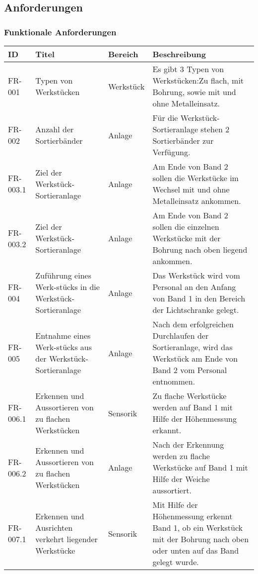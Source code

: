 \documentclass[oneside,a4paper,titlepage]{scrartcl} %
\begin{document}
\subsection{Anforderungen}

\subsubsection{Funktionale Anforderungen}
\begin{small}
 \begin{longtable}{|p{2cm}|p{4cm}|p{1.5cm}|p{5.5cm}|}
  \hline
  \textbf{ID} & \textbf{Titel} & \textbf{Bereich} & \textbf{Beschreibung}\\
  \toprule
  \endhead
  \hline
  FR-001 & Typen von Werkstücken & Werkstück & Es gibt 3 Typen von Werkstücken:Zu flach, mit Bohrung, sowie mit und ohne Metalleinsatz.\\
  \hline
  \rowcolor{gray} FR-002 & Anzahl der Sortierbänder & Anlage & Für die Werkstück-Sortieranlage stehen 2 Sortierbänder zur Verfügung.\\
  \hline
  FR-003.1 & Ziel der Werkstück-Sortieranlage & Anlage & Am Ende von Band 2 sollen die Werkstücke im Wechsel mit und ohne Metalleinsatz ankommen.\\
  \hline
  FR-003.2 & Ziel der Werkstück-Sortieranlage & Anlage & Am Ende von Band 2 sollen die einzelnen Werkstücke mit der Bohrung nach oben liegend ankommen.\\
  \hline
  \rowcolor{gray} FR-004 & Zuführung eines Werk-stücks in die Werkstück-Sortieranlage & Anlage & Das Werkstück wird vom Personal an den Anfang von Band 1 in den Bereich der Lichtschranke gelegt.\\
  \hline
  FR-005 & Entnahme eines Werk-stücks aus der Werkstück-Sortieranlage & Anlage & Nach dem erfolgreichen Durchlaufen der Sortieranlage, wird das Werkstück am Ende von Band 2 vom Personal entnommen.\\
  \hline
  \rowcolor{gray} FR-006.1 & Erkennen und Aussortieren von zu flachen Werkstücken & Sensorik & Zu flache Werkstücke werden auf Band 1 mit Hilfe der Höhenmessung erkannt.\\
  \hline
  \rowcolor{gray} FR-006.2 & Erkennen und Aussortieren von zu flachen Werkstücken & Anlage & Nach der Erkennung werden zu flache Werkstücke auf Band 1 mit Hilfe der Weiche aussortiert.\\
  \hline
  FR-007.1 & Erkennen und Ausrichten verkehrt liegender Werkstücke & Sensorik & Mit Hilfe der Höhenmessung erkennt Band 1, ob ein Werkstück mit der Bohrung nach oben oder unten auf das Band gelegt wurde.\\

\end{longtable}
\end{small}
\end{document}
